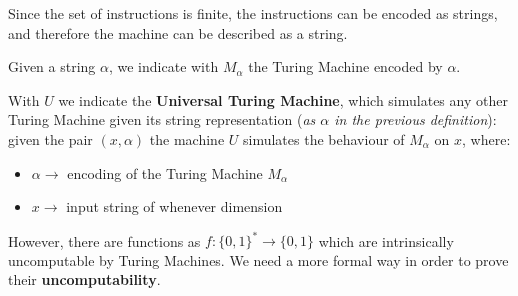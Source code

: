 Since the set of instructions is finite, the instructions can be encoded as strings, and therefore the machine can be described as a string. 
\begin{definition}
    Given a string $\alpha$, we indicate with $M_{\alpha}$ the Turing Machine encoded by $\alpha$.
\end{definition}
\begin{definition}
    With $U$ we indicate the \textbf{Universal Turing Machine}, which simulates any other Turing Machine given its string representation (\textit{as $\alpha$ in the previous definition}):
    given the pair $(x, \alpha)$ the machine $U$ simulates the behaviour of $M_{\alpha}$ on $x$, where:
    \begin{itemize}
        \renewcommand{\labelitemi}{-}
        \item $\alpha \rightarrow$ encoding of the Turing Machine $M_{\alpha}$
        \item $x \rightarrow$ input string of whenever dimension
    \end{itemize}
\end{definition}
However, there are functions as $f: \{0,1\}^* \rightarrow \{0,1\}$ which are intrinsically uncomputable by Turing Machines. We need a more formal way in order to prove 
their \textbf{uncomputability}.